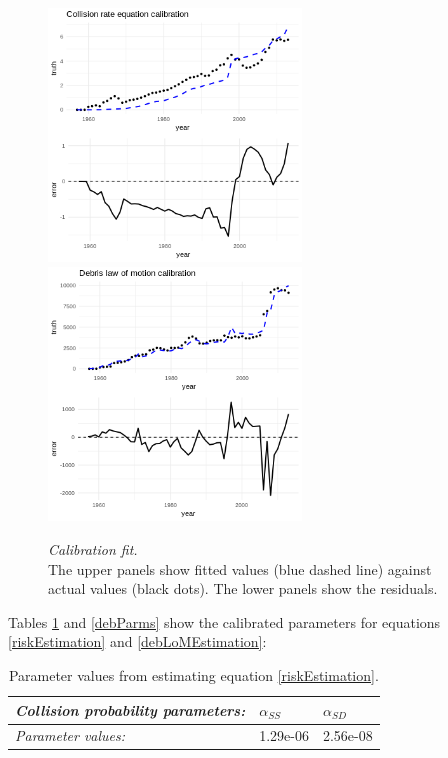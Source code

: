 \documentclass[12pt]{article}
\begin{document}
\begin{figure}
	\hspace*{-1.5cm}
	\includegraphics[width=0.6\textwidth]{../../images/risk_fit_plot.png}
	\includegraphics[width=0.6\textwidth]{../../images/debris_lom_fit_plot.png}
	\captionsetup{format=hang}
	\caption[Collision probability and debris law of motion model fits]{\textit{Calibration fit.} \\
		The upper panels show fitted values (blue dashed line) against actual values (black dots). The lower panels show the residuals.
	}
	\label{debCalibration}
\end{figure}

Tables \ref{riskParms} and \ref{debParms} show the calibrated parameters for equations \ref{riskEstimation} and \ref{debLoMEstimation}:

\begin{table}[H]
	\centering
	\begin{tabular}{|l|l|l|}
		\hline
		\textit{Collision probability parameters:}      & \textbf{$\alpha_{SS}$} & \textbf{$\alpha_{SD}$} \\ \hline
		\textit{Parameter values:} & 1.29e-06               & 2.56e-08               \\ \hline
	\end{tabular}
	\caption[Parameter values from estimating equation \ref{riskEstimation}]{Parameter values from estimating equation \ref{riskEstimation}.}
	\label{riskParms}
\end{table}
\end{document}
